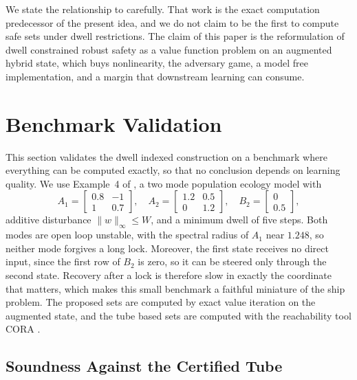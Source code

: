 \documentclass[journal]{IEEEtran}
\begin{document}
We state the relationship to \cite{dehghan2012} carefully. That work is the exact computation predecessor of the present idea, and we do not claim to be the first to compute safe sets under dwell restrictions. The claim of this paper is the reformulation of dwell constrained robust safety as a value function problem on an augmented hybrid state, which buys nonlinearity, the adversary game, a model free implementation, and a margin that downstream learning can consume.

\section{Benchmark Validation}\label{sec_linear}

This section validates the dwell indexed construction on a benchmark where everything can be computed exactly, so that no conclusion depends on learning quality. We use Example~4 of \cite{zhang2016}, a two mode population ecology model with
\begin{equation}
A_1 = \begin{bmatrix} 0.8 & -1 \\ 1 & 0.7 \end{bmatrix}, \quad
A_2 = \begin{bmatrix} 1.2 & 0.5 \\ 0 & 1.2 \end{bmatrix}, \quad
B_2 = \begin{bmatrix} 0 \\ 0.5 \end{bmatrix},
\label{eq_zhang_sys}
\end{equation}
additive disturbance $\|w\|_\infty \le W$, and a minimum dwell of five steps. Both modes are open loop unstable, with the spectral radius of $A_1$ near $1.248$, so neither mode forgives a long lock. Moreover, the first state receives no direct input, since the first row of $B_2$ is zero, so it can be steered only through the second state. Recovery after a lock is therefore slow in exactly the coordinate that matters, which makes this small benchmark a faithful miniature of the ship problem. The proposed sets are computed by exact value iteration on the augmented state, and the tube based sets are computed with the reachability tool CORA \cite{althoff2015cora}.

\subsection{Soundness Against the Certified Tube}
\end{document}
